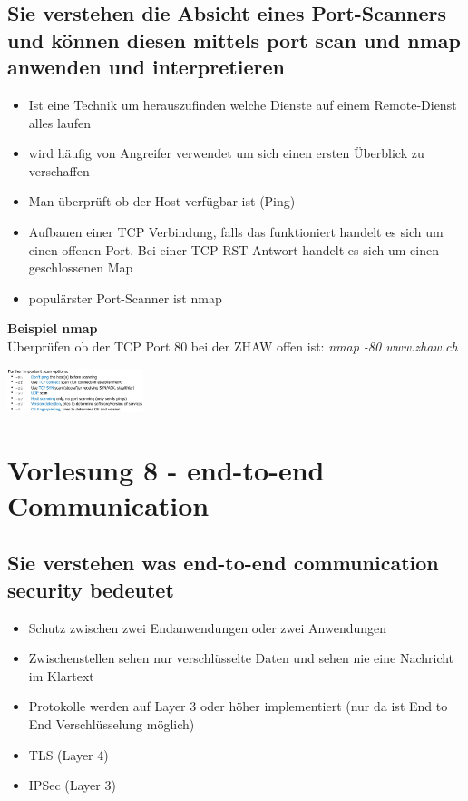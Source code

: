 \documentclass{report}
\newenvironment{Figure}
	{\par\medskip\noindent\minipage{\linewidth}}
	{\endminipage\par\medskip}
\theoremstyle{definition}
\theoremstyle{example}
\begin{document}
\section{Sie verstehen die Absicht eines Port-Scanners und können diesen mittels port scan und nmap anwenden und interpretieren}
\begin{itemize}
	\item Ist eine Technik um herauszufinden welche Dienste auf einem Remote-Dienst alles laufen
	\item wird häufig von Angreifer verwendet um sich einen ersten Überblick zu verschaffen
	\item Man überprüft ob der Host verfügbar ist (Ping)
	\item Aufbauen einer TCP Verbindung, falls das funktioniert handelt es sich um einen offenen Port. Bei einer TCP RST Antwort handelt es sich um einen geschlossenen Map
	\item populärster Port-Scanner ist nmap
\end{itemize}

\textbf{Beispiel nmap}\\
Überprüfen ob der TCP Port 80 bei der ZHAW offen ist: \textit{nmap -80 www.zhaw.ch}\\
\begin{Figure}
\centering
\includegraphics[width=150px]{img/nmapCommand.png}
	\label{fig:Weitere Befehle bei nmap}
\end{Figure}

\chapter{Vorlesung 8 - end-to-end Communication}

\section{Sie verstehen was end-to-end communication security bedeutet}
\begin{itemize}
	\item Schutz zwischen zwei Endanwendungen oder zwei Anwendungen
	\item Zwischenstellen sehen nur verschlüsselte Daten und sehen nie eine Nachricht im Klartext
	\item Protokolle werden auf Layer 3 oder höher implementiert (nur da ist End to End Verschlüsselung möglich)
	\item TLS (Layer 4)
	\item IPSec (Layer 3)
\end{itemize}
\end{document}
